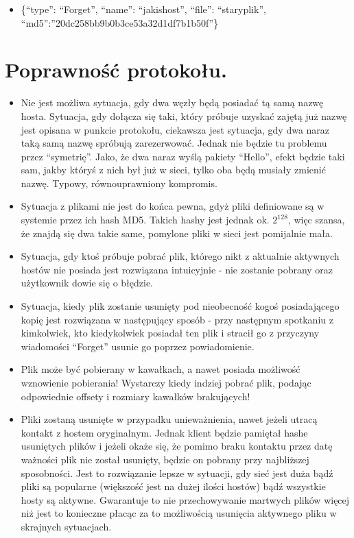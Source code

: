 \documentclass[10pt,a4paper]{article}
\begin{document}
\begin{itemize}
\begin{itemize}
\item \{“type”: “Forget”, “name”: “jakishost”, “file”: “staryplik”, “md5”:”20dc258bb9b0b3ce53a32d1df7b1b50f”\}
\end{itemize}
\end{itemize}
\section{Poprawność protokołu.}
\begin{itemize}
\item Nie jest możliwa sytuacja, gdy dwa węzły będą posiadać tą samą nazwę hosta. Sytuacja, gdy dołącza się taki, który próbuje uzyskać zajętą już nazwę jest opisana w punkcie protokołu, ciekawsza jest sytuacja, gdy dwa naraz taką samą nazwę spróbują zarezerwować. Jednak nie będzie tu problemu przez “symetrię”. Jako, że dwa naraz wyślą pakiety “Hello”, efekt będzie taki sam, jakby któryś z nich był już w sieci, tylko oba będą musiały zmienić nazwę. Typowy, równouprawniony kompromis.
\item Sytuacja z plikami nie jest do końca pewna, gdyż pliki definiowane są w systemie przez ich hash MD5. Takich hashy jest jednak ok. $2^{128}$, więc szansa, że znajdą się dwa takie same, pomylone pliki w sieci jest pomijalnie mała. 
\item Sytuacja, gdy ktoś próbuje pobrać plik, którego nikt z aktualnie aktywnych hostów nie posiada jest rozwiązana intuicyjnie - nie zostanie pobrany oraz użytkownik dowie się o błędzie.
\item Sytuacja, kiedy plik zostanie usunięty pod nieobecność kogoś
posiadającego kopię jest rozwiązana w następujący sposób - 
przy następnym spotkaniu z kimkolwiek, kto kiedykolwiek posiadał ten plik 
i stracił go z przyczyny wiadomości “Forget”  usunie go poprzez
powiadomienie.
\item Plik może być pobierany w kawałkach, a nawet posiada możliwość wznowienie pobierania! Wystarczy kiedy indziej pobrać plik, podając odpowiednie offsety i rozmiary kawałków brakujących!
\item Pliki zostaną usunięte w przypadku unieważnienia, nawet jeżeli utracą kontakt z hostem oryginalnym. Jednak klient będzie pamiętał hashe usuniętych plików i jeżeli okaże się, że pomimo braku kontaktu przez datę ważności plik nie został usunięty, będzie on pobrany przy najbliższej sposobności. Jest to rozwiązanie lepsze w sytuacji, gdy sieć jest duża bądź pliki są popularne (większość jest na dużej ilości hostów) bądź wszystkie hosty są aktywne. Gwarantuje to nie przechowywanie martwych plików więcej niż jest to konieczne płacąc za to możliwością usunięcia aktywnego pliku w skrajnych sytuacjach.
\end{itemize}
\end{document}
